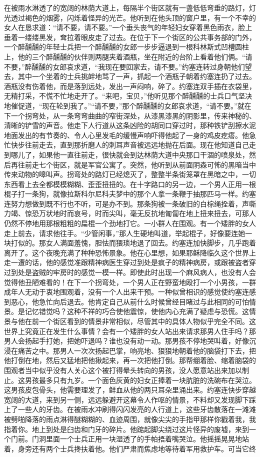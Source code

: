     在被雨水淋透了的宽阔的林荫大道上，每隔半个街区就有一盏低低弯垂的路灯，灯光透过褐色的烟雾，闪烁着怪异的光芒。他听到在他头顶的窗户里，有一个不幸的女人在恳求道：“请不要，请不要。”一个垂头丧气的年轻妇女穿着黑色雨衣，脸上垂着一缕缕黑发，耷拉着眼皮走了过去。在位于下一个街区的公共事务部的门外，一个醉醺醺的年轻士兵把一个醉醺醺的女郎一步步逼退到一根科林斯式凹槽圆柱上，他的三个醉醺醺的伙伴则两腿夹着酒瓶，坐在附近的台阶上看着他们俩。“请不要，”醉醺醺的女郎哀求道，“我现在要回家去，请不要。”约塞连转过身朝他们望去，其中一个坐着的士兵挑衅地骂了一声，抓起一个酒瓶子朝着约塞连扔了过去。酒瓶没有伤着他，而是落到远处，发出一声闷响，碎了。约塞连双手插在衣袋里，无精打采，不慌不忙地走开了。“来吧，宝贝，”他听见那个醉醺醺的士兵口气坚决地催促道，“现在轮到我了。”“请不要，”那个醉醺醺的女郎哀求道，“请不要。”就在下一个拐弯处，从一条弯弯曲曲的窄街深处，从漆黑漆黑的阴影里，传来神秘的、清晰的铲雪的声音。他走下人行道从这条凶险的胡同口穿过时，那种铁铲刮擦水泥地面发出的有节奏的、令人心里发毛的缓慢声响吓得他起了一身的鸡皮疙瘩。他急忙快步往前走去，直到那折磨人的刺耳声音被远远地抛在后面。现在他知道自己走到哪儿了，如果他一直往前走，很快就会到达林荫大道中央那口干涸的喷泉处，然后再往前走七个街区，就是军官公寓了。突然，他听到从前面阴森可怖的黑暗当中传来动物的嗥叫声。拐弯处的路灯已经熄灭了，整整半条街笼罩在黑暗之中，一切东西看上去全都模模糊糊、歪歪扭扭的。在十字路口的另一边，一个男人正用一根棍子打一条狗，就像拉斯科尔尼科夫梦中的那个人拿一条鞭于抽那匹马一样。约塞连努力想做到既不行也不听，可是办不到。那条狗被一条破旧的白棕绳拴着，声嘶力竭、惊恐万状地时而哀号，时而尖叫，毫无反抗地匍匐在地上扭来扭去，可那人仍然不停地用那根粗粗的扁棍一个劲地打它。一小群人在围观。有一个矮胖的女人走上前去，请求他往手。“少管闲事，”那人生硬地叫道，举起棍子，好像要连她一块打似的。那女人满面羞愧，胆怯而猥琐地退了回去。约塞连加快脚步，几乎跑着离开了。这个夜晚充满了种种恐怖景象。他在心里想，如果耶稣降临久这个世界上走一遭的话，他的感觉准跟精神病医生穿过到处是疯子的精神病房，或跟被盗者穿过到处是盗贼的牢房时的感觉一模一样。即使此时出现一个麻风病人，也没有人会觉得他丑陋难看的！在下一个拐弯处，一个男人正在野蛮地殴打一个小男孩，一群成年人无动于衷地围观着，没有一个人出来干预。一种似曾相识的感觉使约塞连感到恶心，他急忙向后退去。他肯定自己从前什么时候曾经目睹过与此相同的可怕情景。是记忆错觉吗？这种不祥的巧合使他震惊，使他内心充满了疑虑与恐慌。这情景与他在前一个街区看到的情景非常相似，尽管其中的具体人物似乎完全不同。这世界上究竟正在发生什么事情？会有一个矮胖的女人站出来请求那男人住手吗？那男人会扬起手打她，把她吓退吗？谁也没有动一动。那男孩不停地哭叫着，好像沉浸在痛苦之中。那男人一次次扬起巴掌，响亮地、狠狠地朝着他的脑袋打下去，把他打倒在地，然后又猛地把他揪起来，再一次把他打倒。那帮绷着脸、缩着脑袋的围观者当中似乎没有人关心这个被打得晕头转向的男孩，没人愿意站出来加以制止。这男孩最多只有九岁。一个面色灰黄的妇女正捧着一块肮脏的洗碗布在哭泣。这男孩皮包骨头，他需要理发了，鲜血从他的两只耳朵里涌出来。约塞连快步穿越宽阔的大道，来到另一侧，远远躲避开这幕令人作呕的情景，不料却又发现脚下踩上了一些人的牙齿。在被雨水冲刷得闪闪发亮的人行道上，这些牙齿散落在一滩滩被劈啪降落的雨点淋得醚糊糊的、血迹周围，就像尖尖的手指甲那样你戳着我，我指着你。地上到处是臼齿和门牙的碎片。他踮起脚尖绕过这片怪异的废墟，来到一个门前。门洞里面一个士兵正用一块湿透了的手帕捂着嘴哭泣。他摇摇晃晃地站着，身旁还有两个士兵搀扶着他。他们严肃而焦虑地等待着军用救护车。可当它终
